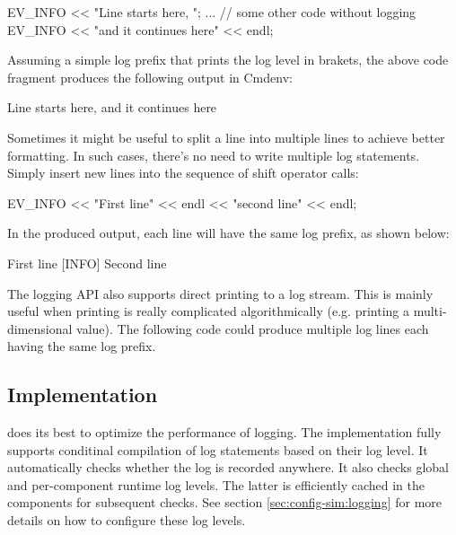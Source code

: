 \begin{cpp}
EV_INFO << "Line starts here, ";
... // some other code without logging
EV_INFO << "and it continues here" << endl;
\end{cpp}

Assuming a simple log prefix that prints the log level in brakets, the above
code fragment produces the following output in Cmdenv:

\begin{filelisting}
[INFO] Line starts here, and it continues here
\end{filelisting}

Sometimes it might be useful to split a line into multiple lines to achieve
better formatting. In such cases, there's no need to write multiple log
statements. Simply insert new lines into the sequence of shift operator calls:

\begin{cpp}
EV_INFO << "First line" << endl << "second line" << endl;
\end{cpp}

In the produced output, each line will have the same log prefix, as shown below:

\begin{filelisting}
[INFO] First line
[INFO] Second line
\end{filelisting}

The {\opp} logging API also supports direct printing to a log stream. This is
mainly useful when printing is really complicated algorithmically (e.g. printing
a multi-dimensional value). The following code could produce multiple log lines
each having the same log prefix.

\begin{cpp}
void Matrix::print(std::stream &output) { ... }
void Matrix::someFunction()
{
   print(EV_INFO);
\end{cpp}


\subsection{Implementation}
\label{sec:sim-lib:logging-implementation}

{\opp} does its best to optimize the performance of logging. The implementation
fully supports conditinal compilation of log statements based on their log
level. It automatically checks whether the log is recorded anywhere. It also
checks global and per-component runtime log levels. The latter is efficiently
cached in the components for subsequent checks. See section
\ref{sec:config-sim:logging} for more details on how to configure these log
levels.

